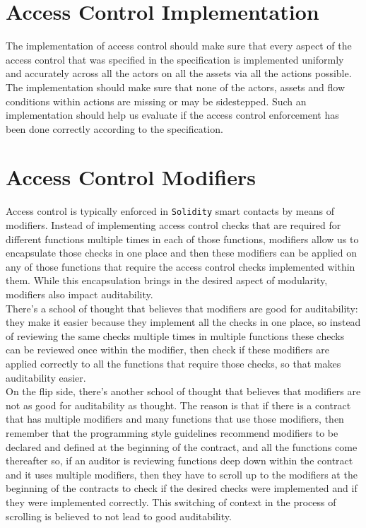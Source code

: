 \section{Access Control Implementation}
The implementation of access control should make sure that every aspect of the access control that was specified in the specification is implemented uniformly and accurately across all the actors on all the assets via all the actions possible. The implementation should make sure that none of the actors, assets and flow conditions within actions are missing or may be sidestepped. Such an implementation should help us evaluate if the access control enforcement has been done correctly according to the specification.

\section{Access Control Modifiers}
Access control is typically enforced in \verb|Solidity| smart contacts by means of modifiers. Instead of implementing access control checks that are required for different functions multiple times in each of those functions, modifiers allow us to encapsulate those checks in one place and then these modifiers can be applied on any of those functions that require the access control checks implemented within them. While this encapsulation brings in the desired aspect of modularity, modifiers also impact auditability.\\

There's a school of thought that believes that modifiers are good for auditability: they make it easier because they implement all the checks in one place, so instead of reviewing the same checks multiple times in multiple functions these checks can be reviewed once within the modifier, then check if these modifiers are applied correctly to all the functions that require those checks, so that makes auditability easier.\\

On the flip side, there's another school of thought that believes that modifiers are not as good for auditability as thought. The reason is that if there is a contract that has multiple modifiers and many functions that use those modifiers, then remember that the programming style guidelines recommend modifiers to be declared and defined at the beginning of the contract, and all the functions come thereafter so, if an auditor is reviewing functions deep down within the contract and it uses multiple modifiers, then they have to scroll up to the modifiers at the beginning of the contracts to check if the desired checks were implemented and if they were implemented correctly. This switching of context in the process of scrolling is believed to not lead to good auditability.\\

